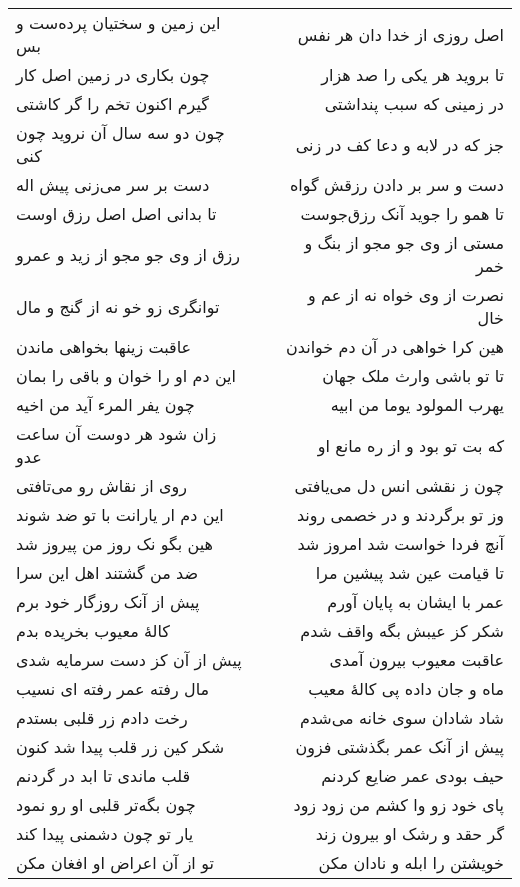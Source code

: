 \begin{center}
\begin{longtable}{l p{0.5cm} r}
این زمین و سختیان پرده‌ست و بس
&&
اصل روزی از خدا دان هر نفس
\\
چون بکاری در زمین اصل کار
&&
تا بروید هر یکی را صد هزار
\\
گیرم اکنون تخم را گر کاشتی
&&
در زمینی که سبب پنداشتی
\\
چون دو سه سال آن نروید چون کنی
&&
جز که در لابه و دعا کف در زنی
\\
دست بر سر می‌زنی پیش اله
&&
دست و سر بر دادن رزقش گواه
\\
تا بدانی اصل اصل رزق اوست
&&
تا همو را جوید آنک رزق‌جوست
\\
رزق از وی جو مجو از زید و عمرو
&&
مستی از وی جو مجو از بنگ و خمر
\\
توانگری زو خو نه از گنج و مال
&&
نصرت از وی خواه نه از عم و خال
\\
عاقبت زینها بخواهی ماندن
&&
هین کرا خواهی در آن دم خواندن
\\
این دم او را خوان و باقی را بمان
&&
تا تو باشی وارث ملک جهان
\\
چون یفر المرء آید من اخیه
&&
یهرب المولود یوما من ابیه
\\
زان شود هر دوست آن ساعت عدو
&&
که بت تو بود و از ره مانع او
\\
روی از نقاش رو می‌تافتی
&&
چون ز نقشی انس دل می‌یافتی
\\
این دم ار یارانت با تو ضد شوند
&&
وز تو برگردند و در خصمی روند
\\
هین بگو نک روز من پیروز شد
&&
آنچ فردا خواست شد امروز شد
\\
ضد من گشتند اهل این سرا
&&
تا قیامت عین شد پیشین مرا
\\
پیش از آنک روزگار خود برم
&&
عمر با ایشان به پایان آورم
\\
کالهٔ معیوب بخریده بدم
&&
شکر کز عیبش بگه واقف شدم
\\
پیش از آن کز دست سرمایه شدی
&&
عاقبت معیوب بیرون آمدی
\\
مال رفته عمر رفته ای نسیب
&&
ماه و جان داده پی کالهٔ معیب
\\
رخت دادم زر قلبی بستدم
&&
شاد شادان سوی خانه می‌شدم
\\
شکر کین زر قلب پیدا شد کنون
&&
پیش از آنک عمر بگذشتی فزون
\\
قلب ماندی تا ابد در گردنم
&&
حیف بودی عمر ضایع کردنم
\\
چون بگه‌تر قلبی او رو نمود
&&
پای خود زو وا کشم من زود زود
\\
یار تو چون دشمنی پیدا کند
&&
گر حقد و رشک او بیرون زند
\\
تو از آن اعراض او افغان مکن
&&
خویشتن را ابله و نادان مکن
\\

\end{longtable}
\end{center}
